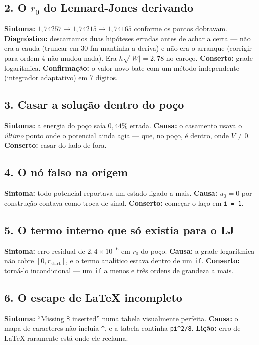 \documentclass[11pt,a4paper]{article}
\begin{document}
\subsection*{2. O $r_0$ do Lennard-Jones derivando}
\textbf{Sintoma:} $1{,}74257 \to 1{,}74215 \to 1{,}74165$ conforme os pontos
dobravam. \textbf{Diagnóstico:} descartamos duas hipóteses erradas antes de
achar a certa --- não era a cauda (truncar em 30 fm mantinha a deriva) e não era
o arranque (corrigir para ordem 4 não mudou nada). Era $h\sqrt{|W|} = 2{,}78$ no
caroço. \textbf{Conserto:} grade logarítmica. \textbf{Confirmação:} o valor novo
bate com um método independente (integrador adaptativo) em 7 dígitos.

\subsection*{3. Casar a solução dentro do poço}
\textbf{Sintoma:} a energia do poço saía $0{,}44\%$ errada.
\textbf{Causa:} o casamento usava o \emph{último} ponto onde o potencial ainda
agia --- que, no poço, é dentro, onde $V\neq0$. \textbf{Conserto:} casar do lado
de fora.

\subsection*{4. O nó falso na origem}
\textbf{Sintoma:} todo potencial reportava um estado ligado a mais.
\textbf{Causa:} $u_0 = 0$ por construção contava como troca de sinal.
\textbf{Conserto:} começar o laço em \texttt{i = 1}.

\subsection*{5. O termo interno que só existia para o LJ}
\textbf{Sintoma:} erro residual de $2{,}4\times10^{-6}$ em $r_0$ do poço.
\textbf{Causa:} a grade logarítmica não cobre $[0, r_{\text{start}}]$, e o termo
analítico estava dentro de um \texttt{if}. \textbf{Conserto:} torná-lo
incondicional --- um \texttt{if} a menos e três ordens de grandeza a mais.

\subsection*{6. O escape de \LaTeX{} incompleto}
\textbf{Sintoma:} ``Missing \$ inserted'' numa tabela visualmente perfeita.
\textbf{Causa:} o mapa de caracteres não incluía \verb|^|, e a tabela continha
\verb|pi^2/8|. \textbf{Lição:} erro de \LaTeX{} raramente está onde ele reclama.
\end{document}
